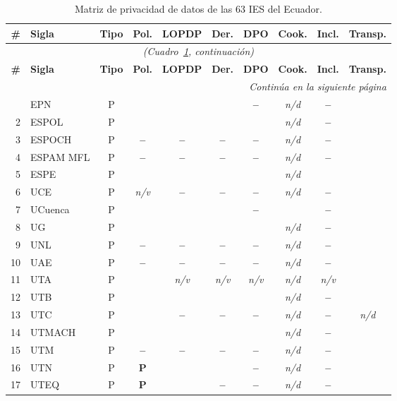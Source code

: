 \documentclass[pdflatex,sn-basic,Numbered]{sn-jnl}
\newcommand{\si}{\ding{51}}
\newcommand{\no}{\textcolor{gris}{\textbf{--}}}
\newcommand{\pc}{\textbf{P}}
\newcommand{\nv}{\textsl{\footnotesize n/v}}
\newcommand{\nd}{\textsl{\footnotesize n/d}}
\theoremstyle{thmstyleone}
\theoremstyle{thmstyletwo}
\theoremstyle{thmstylethree}
\begin{document}
\begin{appendices}
\footnotesize
\begin{longtable}{@{}r l c c c c c c c c@{}}
	\caption{Matriz de privacidad de datos de las 63 IES del Ecuador.}\label{tab:ecuador}\\
	\toprule
	\textbf{\#} & \textbf{Sigla} & \textbf{Tipo} & \textbf{Pol.} & \textbf{LOPDP} & \textbf{Der.} & \textbf{DPO} & \textbf{Cook.} & \textbf{Incl.} & \textbf{Transp.} \\
	\midrule
	\endfirsthead
	\multicolumn{10}{c}{\textit{(Cuadro~\ref{tab:ecuador}, continuación)}}\\
	\toprule
	\textbf{\#} & \textbf{Sigla} & \textbf{Tipo} & \textbf{Pol.} & \textbf{LOPDP} & \textbf{Der.} & \textbf{DPO} & \textbf{Cook.} & \textbf{Incl.} & \textbf{Transp.} \\
	\midrule
	\endhead
	\midrule
	\multicolumn{10}{r}{\textit{Continúa en la siguiente página}}\\
	\endfoot
	\bottomrule
	\endlastfoot
	1 & EPN & P & \si & \si & \si & \no & \nd & \no & \si \\
	2 & ESPOL & P & \si & \si & \si & \si & \nd & \no & \si \\
	3 & ESPOCH & P & \no & \no & \no & \no & \nd & \no & \si \\
	4 & ESPAM MFL & P & \no & \no & \no & \no & \nd & \no & \si \\
	5 & ESPE & P & \si & \si & \si & \si & \nd & \si & \si \\
	6 & UCE & P & \nv & \no & \no & \no & \nd & \no & \si \\
	7 & UCuenca & P & \si & \si & \si & \no & \si & \no & \si \\
	8 & UG & P & \si & \si & \si & \si & \nd & \no & \si \\
	9 & UNL & P & \no & \no & \no & \no & \nd & \no & \si \\
	10 & UAE & P & \no & \no & \no & \no & \nd & \no & \si \\
	11 & UTA & P & \si & \nv & \nv & \nv & \nd & \nv & \si \\
	12 & UTB & P & \si & \si & \si & \si & \nd & \no & \si \\
	13 & UTC & P & \si & \no & \no & \no & \nd & \no & \nd \\
	14 & UTMACH & P & \si & \si & \si & \si & \nd & \no & \si \\
	15 & UTM & P & \no & \no & \no & \no & \nd & \no & \si \\
	16 & UTN & P & \pc & \si & \si & \no & \nd & \no & \si \\
	17 & UTEQ & P & \pc & \si & \no & \no & \nd & \no & \si \\

\end{longtable}
\end{appendices}
\end{document}
